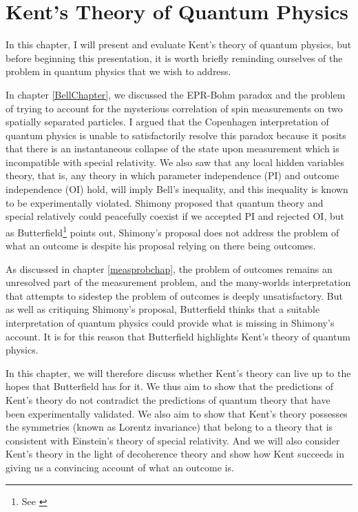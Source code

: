 \chapter{Kent's Theory of Quantum Physics\label{kentchapter}}
In this chapter, I will present and evaluate Kent's theory of quantum physics, but before beginning this presentation, it is worth briefly reminding ourselves of the problem in quantum physics that we wish to address. 

In chapter \ref{BellChapter}, we discussed the EPR-Bohm paradox and the problem of trying to account for the mysterious correlation of spin measurements on two spatially separated particles. I argued that the Copenhagen interpretation of quantum physics is unable to satisfactorily resolve this paradox because it posits that there is an instantaneous collapse of the state upon measurement which is incompatible with special relativity. We also saw that any local hidden variables theory, that is, any theory in which parameter independence (PI) and outcome independence (OI) hold, will imply Bell's inequality, and this inequality is known to be experimentally violated. Shimony proposed that quantum theory and special relatively could peacefully coexist if we accepted PI and rejected OI, but as Butterfield\footnote{See \cite{Butterfield}} points out, Shimony's proposal  does not address the problem of what an outcome is despite his proposal relying on there being outcomes. 

As discussed in chapter \ref{measprobchap}, the problem of outcomes remains an unresolved part of the measurement problem, and the many-worlds interpretation that attempts to sidestep the problem of outcomes is deeply unsatisfactory. But as well as critiquing Shimony's proposal, Butterfield thinks that a suitable interpretation of quantum physics could provide what is missing in Shimony's account. It is for this reason that Butterfield highlights Kent's theory of quantum physics.

In this chapter, we will therefore discuss whether Kent's theory can live up to the hopes that Butterfield has for it. We thus aim to show that the predictions of Kent's theory do not contradict the  predictions of quantum theory that have been experimentally validated. We also aim to show that Kent's theory possesses the symmetries (known as Lorentz invariance) that belong to a theory that is consistent with Einstein's theory of special relativity. And we will also consider Kent's theory in the light of decoherence theory and show how Kent succeeds in giving us a convincing account of what an outcome is. 

